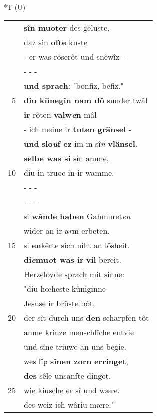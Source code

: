 \documentclass[8pt,a4paper,notitlepage]{article}
\begin{document}
\begin{table}[ht]
\begin{minipage}[t]{0.5\linewidth}
\end{minipage}
\hspace{0.5cm}
\begin{minipage}[t]{0.5\linewidth}
\small
\begin{center}*T (U)
\end{center}
\begin{tabular}{rl}
 & \textbf{sîn muoter} des geluste,\\ 
 & daz sin \textbf{ofte} kuste\\ 
 & - er was rôserôt und snêwîz -\\ 
 & \multicolumn{1}{l}{ - - - }\\ 
 & \textbf{und sprach}: "bonfiz, befiz."\\ 
5 & \textbf{diu künegîn nam dô} sunder twâl\\ 
 & \textbf{ir} rôten \textbf{valw\textit{e}n} mâl\\ 
 & - ich meine ir \textbf{tuten gränsel} -\\ 
 & \textbf{und} \textbf{slo\textit{u}f ez} im in sî\textit{n} \textbf{vlänsel}.\\ 
 & \textbf{selbe was si} sîn amme,\\ 
10 & diu in truoc in ir wamme.\\ 
 & \multicolumn{1}{l}{ - - - }\\ 
 & \multicolumn{1}{l}{ - - - }\\ 
 & si \textbf{wânde} \textbf{haben} Gahmuret\textit{en}\\ 
 & wider an ir a\textit{r}m erbeten.\\ 
15 & si \textbf{en}kêrte sich niht an lôsheit.\\ 
 & \textbf{di\textit{e}mu\textit{o}t was ir} \textbf{vil} bereit.\\ 
 & Herzeloyde sprach mit sinne:\\ 
 & "diu hœheste küniginne\\ 
 & Jesuse ir brüste bôt,\\ 
20 & der sît durch uns \textbf{den} scharpfen tôt\\ 
 & anme kriuze menschlîche entvie\\ 
 & und sîne triuwe an uns begie.\\ 
 & wes lîp \textbf{sînen zorn} \textbf{erringet},\\ 
 & \textbf{des} sêle unsanfte dinget,\\ 
25 & wie kiusche er sî und wære.\\ 
 & des weiz ich wâriu mære."\\ 

\end{tabular}
\end{minipage}
\end{table}
\end{document}
